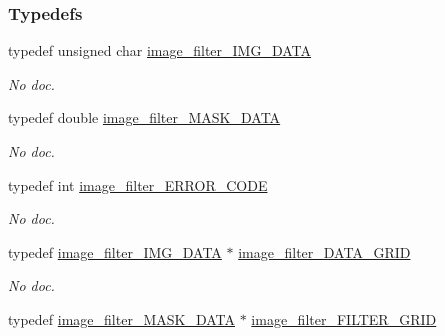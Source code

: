 \subsubsection*{Typedefs}
\begin{DoxyCompactItemize}
\item 
\hypertarget{a00012_afbdd6cd26209a0a7c753b951a39160e3}{typedef unsigned char \hyperlink{a00012_afbdd6cd26209a0a7c753b951a39160e3}{image\-\_\-filter\-\_\-\-I\-M\-G\-\_\-\-D\-A\-T\-A}}\label{a00012_afbdd6cd26209a0a7c753b951a39160e3}

\begin{DoxyCompactList}\small\item\em No doc. \end{DoxyCompactList}\item 
\hypertarget{a00012_a4782d495f3f1d69b311256832dd5dc4b}{typedef double \hyperlink{a00012_a4782d495f3f1d69b311256832dd5dc4b}{image\-\_\-filter\-\_\-\-M\-A\-S\-K\-\_\-\-D\-A\-T\-A}}\label{a00012_a4782d495f3f1d69b311256832dd5dc4b}

\begin{DoxyCompactList}\small\item\em No doc. \end{DoxyCompactList}\item 
\hypertarget{a00012_a82e8ecafbcdb867e945139ffe89f63c4}{typedef int \hyperlink{a00012_a82e8ecafbcdb867e945139ffe89f63c4}{image\-\_\-filter\-\_\-\-E\-R\-R\-O\-R\-\_\-\-C\-O\-D\-E}}\label{a00012_a82e8ecafbcdb867e945139ffe89f63c4}

\begin{DoxyCompactList}\small\item\em No doc. \end{DoxyCompactList}\item 
\hypertarget{a00012_a1505c2ea7ed5ea8156460fa804a43730}{typedef \hyperlink{a00012_afbdd6cd26209a0a7c753b951a39160e3}{image\-\_\-filter\-\_\-\-I\-M\-G\-\_\-\-D\-A\-T\-A} $\ast$ \hyperlink{a00012_a1505c2ea7ed5ea8156460fa804a43730}{image\-\_\-filter\-\_\-\-D\-A\-T\-A\-\_\-\-G\-R\-I\-D}}\label{a00012_a1505c2ea7ed5ea8156460fa804a43730}

\begin{DoxyCompactList}\small\item\em No doc. \end{DoxyCompactList}\item 
\hypertarget{a00012_a3d41ec3c203c47ad7dec21ff55acc883}{typedef \hyperlink{a00012_a4782d495f3f1d69b311256832dd5dc4b}{image\-\_\-filter\-\_\-\-M\-A\-S\-K\-\_\-\-D\-A\-T\-A} $\ast$ \hyperlink{a00012_a3d41ec3c203c47ad7dec21ff55acc883}{image\-\_\-filter\-\_\-\-F\-I\-L\-T\-E\-R\-\_\-\-G\-R\-I\-D}}\label{a00012_a3d41ec3c203c47ad7dec21ff55acc883}


\end{DoxyCompactItemize}
